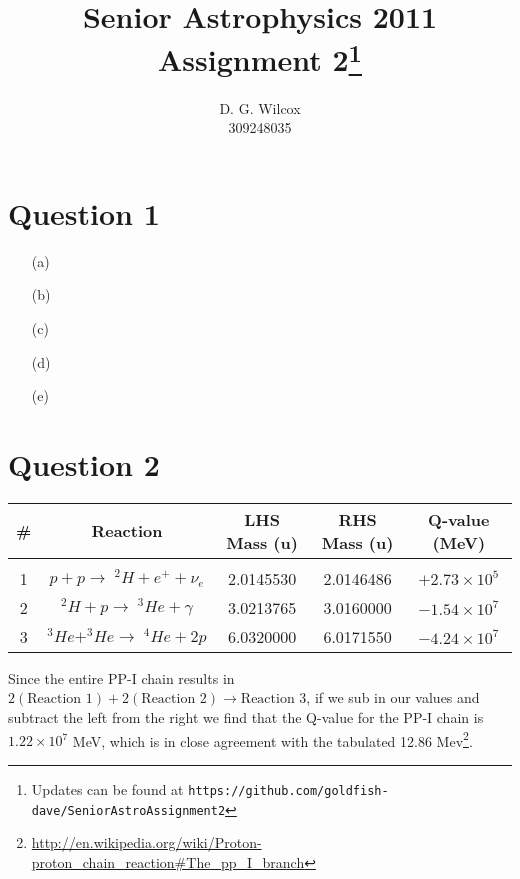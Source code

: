 \documentclass[10pt,a4paper]{article}
\title{Senior Astrophysics 2011 Assignment 2\footnote{Updates can be found at \texttt{https://github.com/goldfish-dave/SeniorAstroAssignment2}}}
\date{}
\author{D. G. Wilcox \\
		309248035}
\begin{document}
\maketitle

\section*{Question 1}
\begin{itemize}
    \item[(a)]
    \item[(b)]
    \item[(c)]
    \item[(d)]
    \item[(e)]
\end{itemize}
\section*{Question 2}
\newcommand{\reactionOne}{$p + p \rightarrow \; ^{2}H + e^{+} + \nu_{e}$}
\newcommand{\reactionTwo}{$^{2}H + p \rightarrow \;^{3}He + \gamma$}
\newcommand{\reactionThree}{$^{3}He + ^{3}He \rightarrow \;^{4}He + 2p$}

\newcommand{\qvalueOne}{$+2.73 \times 10^{5}$}
\newcommand{\qvalueTwo}{$-1.54 \times 10^{7}$}
\newcommand{\qvalueThree}{$-4.24 \times 10^{7}$}

\begin{table}[h]
    \begin{tabular}{c|c|c|c|c}
        \#   &   Reaction            &   LHS Mass   (u)    &   RHS Mass (u)    &   Q-value (MeV) \\
        \hline \\
        1    &   \reactionOne{}      &   2.0145530         &   2.0146486       &   \qvalueOne{}  \\
        2    &   \reactionTwo{}      &   3.0213765         &   3.0160000       &   \qvalueTwo{}  \\
        3    &   \reactionThree{}    &   6.0320000         &   6.0171550       &   \qvalueThree{} \\
    \end{tabular}
\end{table}
Since the entire PP-I chain results in $2(\mbox{Reaction } 1) + 2(\mbox{Reaction } 2) \rightarrow \mbox{Reaction } 3$, if we sub in our values and subtract the left from the right we find that the Q-value for the PP-I chain is $1.22 \times 10^{7}$ MeV, which is in close agreement with the tabulated 12.86 Mev\footnote{\url{http://en.wikipedia.org/wiki/Proton-proton_chain_reaction#The_pp_I_branch}}.
\end{document}
